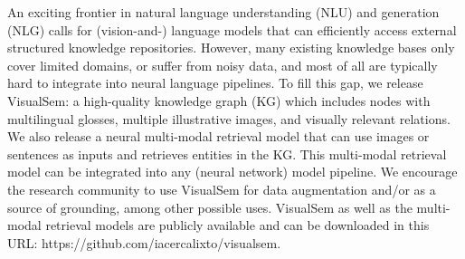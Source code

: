 An exciting frontier in natural language understanding (NLU) and generation (NLG) calls for (vision-and-) language models that can efficiently access external structured knowledge repositories. However, many existing knowledge bases only cover limited domains, or suffer from noisy data, and most of all are typically hard to integrate into neural language pipelines. To fill this gap, we release VisualSem: a high-quality knowledge graph (KG) which includes nodes with multilingual glosses, multiple illustrative images, and visually relevant relations. We also release a neural multi-modal retrieval model that can use images or sentences as inputs and retrieves entities in the KG. This multi-modal retrieval model can be integrated into any (neural network) model pipeline. We encourage the research community to use VisualSem for data augmentation and/or as a source of grounding, among other possible uses. VisualSem as well as the multi-modal retrieval models are publicly available and can be downloaded in this URL: https://github.com/iacercalixto/visualsem.
